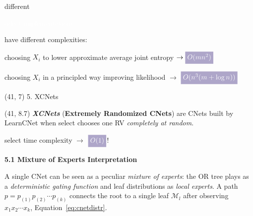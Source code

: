 \documentclass[final]{beamer}
\newcommand{\highlight}[2][yellow]{\mathchoice%
  {\colorbox{#1}{\strut\textcolor{white}{$\displaystyle{#2}$}}}%
  {\colorbox{#1}{\strut\textcolor{white}{$\textstyle{#2}$}}}%
  {\colorbox{#1}{\strut\textcolor{white}{$\scriptstyle{#2}$}}}%
  {\colorbox{#1}{\strut\textcolor{white}{$\scriptscriptstyle{#2}$}}}}%
\newcommand{\highlighttext}[2][yellow]{{\colorbox{#1}{\strut\textcolor{white}{#2}}}}
\begin{document}
\begin{frame}{}
\begin{textblock}{17.5}
\begin{center}
\begin{minipage}{0.9\linewidth}
\end{minipage}
\end{center}
\vspace{10pt}
    different \highlighttext[lacamlightlilac]{\textsf{select} implementations}
    have different complexities:
    \vspace{10pt}

    \begin{center}
      \begin{minipage}{0.9\linewidth}
        \begin{description}[align=parright]
        \item[\textbf{\textsf{entCNet}}~\cite{Rahman2014}] choosing
          $X_{i}$ to lower approximate average joint entropy
          {\hfill $\rightarrow\highlight[lacamlightlilac]{O(mn^2)}$}
        \item[\textbf{\textsf{dCSN}}~\cite{DiMauro2015a}] choosing
          $X_{i}$ in a principled way improving likelihood
          {\hfill $\rightarrow$ $\highlight[lacamlightlilac]{O(n^3(m + \log n))}$}
        \end{description}
      \end{minipage}
    \end{center}
    
  \end{textblock}





  \begin{textblock}{17.5}(41, 7)
    5. XCNets
  \end{textblock}
  \begin{textblock}{17.5}(41, 8.7)
    \small
    \emph{\textbf{XCNets}} (\textbf{Extremely Randomized CNets}) are CNets built by \textsf{LearnCNet} when
    \textsf{select} chooses one RV \emph{completely at random}.\par
    {\hfill\textsf{select} time complexity $\rightarrow$ $\highlight[lacamlightlilac]{O(1)}$!}
    \vspace{20pt}


    {\bf 5.1 Mixture of Experts Interpretation}\par
    A single CNet can be seen as a peculiar \emph{mixture of experts}: the OR
    tree plays as a \emph{deterministic gating function} and leaf distributions
    as \emph{local experts}.
    A path $p=p_{(1)}p_{(2)}\cdots p_{(k)}$ connects the root to a
    single leaf $\mathcal{M}_{l}$ after observing $x_{1} x_{2} \cdots  x_{k}$,
     Equation~\ref{eq:cnetdistr}.


\end{textblock}
\end{frame}
\end{document}
